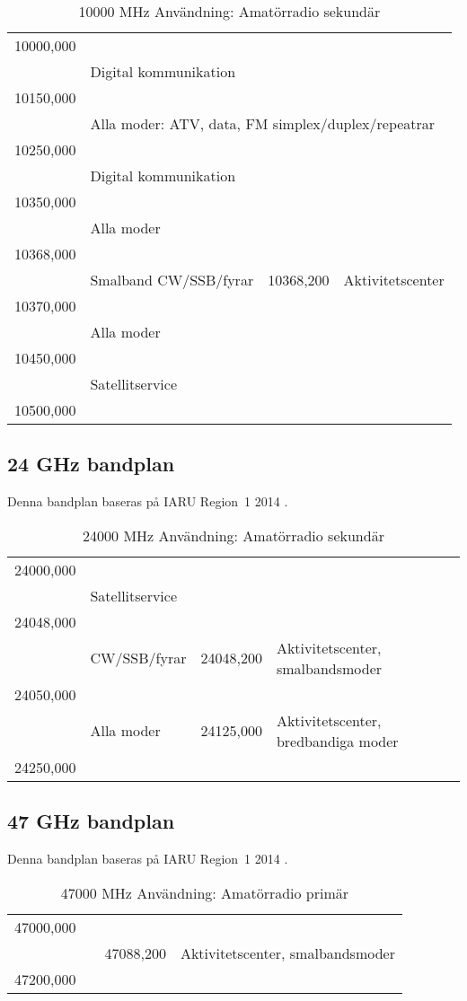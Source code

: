 \setlongtables
\begin{longtable}{llll}
\caption{10000 MHz Användning: Amatörradio sekundär} \\
10000,000 & & & \\
          & \multicolumn{3}{l}{Digital kommunikation} \\
10150,000 & & & \\
          & \multicolumn{3}{l}{Alla moder: ATV, data, FM simplex/duplex/repeatrar} \\
10250,000 & & & \\
          & \multicolumn{3}{l}{Digital kommunikation} \\
10350,000 & & & \\
          & \multicolumn{3}{l}{Alla moder} \\
10368,000 & & & \\
          & Smalband CW/SSB/fyrar & 10368,200 & Aktivitetscenter \\
10370,000 & & & \\
          & \multicolumn{3}{l}{Alla moder} \\
10450,000 & & & \\
          & \multicolumn{3}{l}{Satellitservice} \\
10500,000 & & & \\
\end{longtable}

\subsection{24 GHz bandplan}
\label{24GHzbandplan}
Denna bandplan baseras på IARU Region~1 2014 \cite{IARU1}.

\setlongtables
\begin{longtable}{llll}
\caption{24000 MHz Användning: Amatörradio sekundär} \\
24000,000 & & & \\
          & \multicolumn{3}{l}{Satellitservice} \\
24048,000 & & & \\
          & CW/SSB/fyrar & 24048,200 & Aktivitetscenter, smalbandsmoder \\
24050,000 & & & \\
          & Alla moder   & 24125,000 & Aktivitetscenter, bredbandiga moder \\
24250,000 & & & \\
\end{longtable}

\subsection{47 GHz bandplan}
\label{47GHzbandplan}
Denna bandplan baseras på IARU Region~1 2014 \cite{IARU1}.

\setlongtables
\begin{longtable}{llll}
\caption{47000 MHz Användning: Amatörradio primär} \\
47000,000 & & & \\
          & & 47088,200 & Aktivitetscenter, smalbandsmoder \\
47200,000 & & & \\
\end{longtable}

\twocolumn
